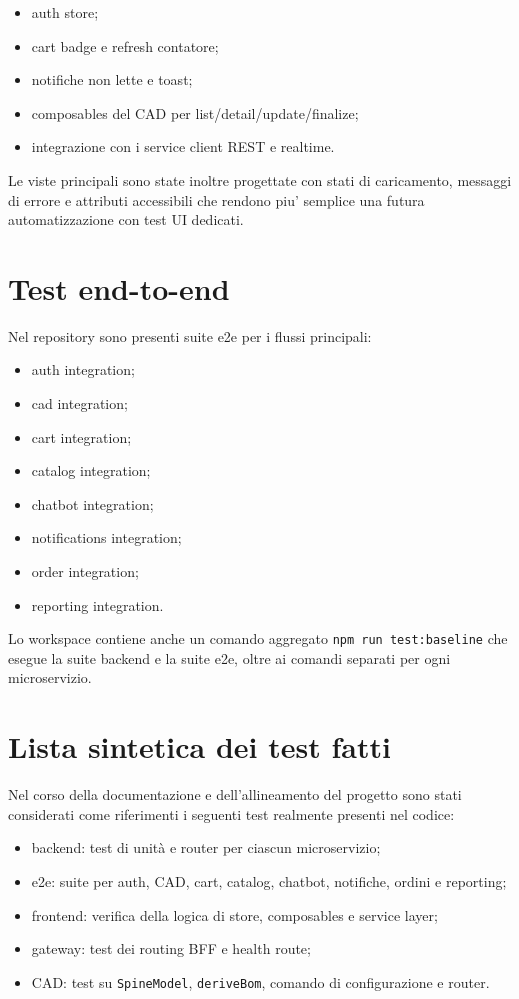 \begin{itemize}
\item auth store;
\item cart badge e refresh contatore;
\item notifiche non lette e toast;
\item composables del CAD per list/detail/update/finalize;
\item integrazione con i service client REST e realtime.
\end{itemize}

Le viste principali sono state inoltre progettate con stati di caricamento, messaggi di errore e attributi accessibili che rendono piu' semplice una futura automatizzazione con test UI dedicati.

\section{Test end-to-end}

Nel repository sono presenti suite e2e per i flussi principali:

\begin{itemize}
\item auth integration;
\item cad integration;
\item cart integration;
\item catalog integration;
\item chatbot integration;
\item notifications integration;
\item order integration;
\item reporting integration.
\end{itemize}

Lo workspace contiene anche un comando aggregato \texttt{npm run test:baseline} che esegue la suite backend e la suite e2e, oltre ai comandi separati per ogni microservizio.

\section{Lista sintetica dei test fatti}

Nel corso della documentazione e dell'allineamento del progetto sono stati considerati come riferimenti i seguenti test realmente presenti nel codice:

\begin{itemize}
\item backend: test di unit\`a e router per ciascun microservizio;
\item e2e: suite per auth, CAD, cart, catalog, chatbot, notifiche, ordini e reporting;
\item frontend: verifica della logica di store, composables e service layer;
\item gateway: test dei routing BFF e health route;
\item CAD: test su \texttt{SpineModel}, \texttt{deriveBom}, comando di configurazione e router.
\end{itemize}

